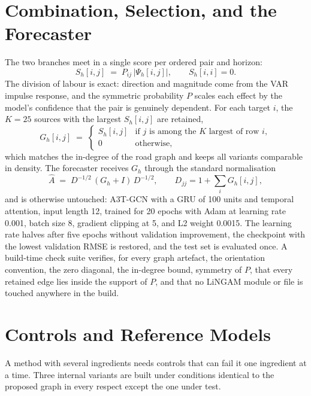 \documentclass[MTech]{ugthesis}
\begin{document}
\section{Combination, Selection, and the Forecaster}
\label{sec:combine}

The two branches meet in a single score per ordered pair and horizon:
\begin{equation}
S_h[i,j] \;=\; P_{ij}\,\bigl|\Psi_h[i,j]\bigr|, \qquad S_h[i,i] = 0 .
\label{eq:score}
\end{equation}
The division of labour is exact: direction and magnitude come from the VAR impulse response, and the symmetric probability $P$ scales each effect by the model's confidence that the pair is genuinely dependent. For each target $i$, the $K=25$ sources with the largest $S_h[i,j]$ are retained,
\begin{equation}
G_h[i,j] \;=\;
\begin{cases}
S_h[i,j] & \text{if } j \text{ is among the } K \text{ largest of row } i,\\[2pt]
0 & \text{otherwise},
\end{cases}
\label{eq:topk}
\end{equation}
which matches the in-degree of the road graph and keeps all variants comparable in density. The forecaster receives $G_h$ through the standard normalisation
\begin{equation}
\hat{A} \;=\; D^{-1/2}\,(G_h + I)\,D^{-1/2}, \qquad D_{jj} = 1 + \textstyle\sum_i G_h[i,j],
\label{eq:norm}
\end{equation}
and is otherwise untouched: A3T-GCN \citep{zhu2020a3tgcn} with a \ac{GRU} of 100 units and temporal attention, input length 12, trained for 20 epochs with Adam at learning rate 0.001, batch size 8, gradient clipping at 5, and L2 weight 0.0015. The learning rate halves after five epochs without validation improvement, the checkpoint with the lowest validation RMSE is restored, and the test set is evaluated once. A build-time check suite verifies, for every graph artefact, the orientation convention, the zero diagonal, the in-degree bound, symmetry of $P$, that every retained edge lies inside the support of $P$, and that no LiNGAM module or file is touched anywhere in the build.

\section{Controls and Reference Models}
\label{sec:controls}

A method with several ingredients needs controls that can fail it one ingredient at a time. Three internal variants are built under conditions identical to the proposed graph in every respect except the one under test.
\end{document}
